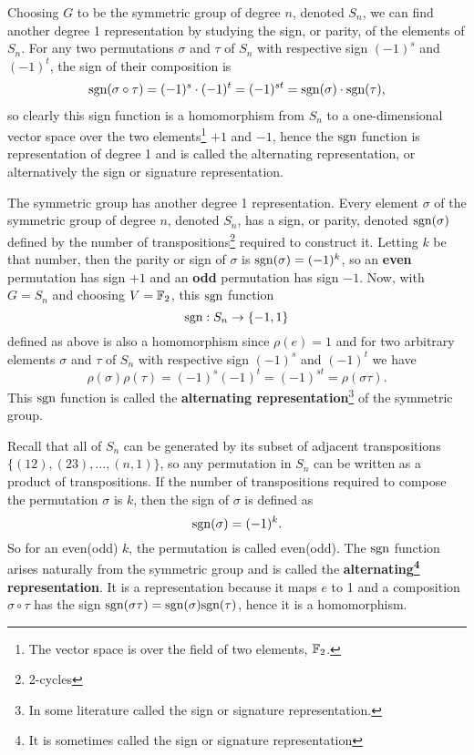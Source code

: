 	Choosing $G$ to be the symmetric group of degree $n$, denoted $S_n$, we can find another degree 1 representation by studying the sign, or parity, of the elements of $S_n$. For any two permutations $\sigma$ and $\tau$ of $S_n$ with respective sign $(-1)^s$ and $(-1)^t$, the sign of their composition is 
	\begin{align}
		\text{sgn}(\sigma \circ \tau) = (-1)^s \cdot (-1)^t = (-1)^{st} = \text{sgn}(\sigma) \cdot \text{sgn}(\tau),
	\end{align}
	so clearly this sign function is a homomorphism from $S_n$ to a one-dimensional vector space over the two elements\footnote{The vector space is over the field of two elements, $\mathbb{F}_2$.} $+1$ and $-1$, hence the $\text{sgn}$ function is representation of degree 1 and is called the alternating representation, or alternatively the sign or signature representation.
	
	The symmetric group has another degree 1 representation. Every element $\sigma$ of the symmetric group of degree $n$, denoted $S_n$, has a sign, or parity, denoted $\text{sgn}(\sigma)$ defined by the number of transpositions\footnote{2-cycles} required to construct it. Letting $k$ be that number, then the parity or sign of $\sigma$ is $\text{sgn}(\sigma)=(-1)^k$, so an \textbf{even} permutation has sign $+1$ and an \textbf{odd} permutation has sign $-1$. Now, with $G = S_n$ and choosing $V=\mathbb{F}_2$, this $\text{sgn}$ function
	\[
	\text{sgn}: S_n \rightarrow \{-1, 1\}
	\]
	defined as above is also a homomorphism since $\rho(e) = 1$ and for two arbitrary elements $\sigma$ and $\tau$ of $S_n$ with respective sign $(-1)^s$ and $(-1)^t$ we have 
	\[
	\rho(\sigma)\rho(\tau) = (-1)^s(-1)^t = (-1)^{st} = \rho(\sigma\tau).
	\] 
	This $\text{sgn}$ function is called the \textbf{alternating representation}\footnote{In some literature called the sign or signature representation.} of the symmetric group.
	
	Recall that all of $S_n$ can be generated by its subset of adjacent transpositions $\{(12), (23), \dots, (n,1)\}$, so any permutation in $S_n$ can be written as a product of transpositions. If the number of transpositions required to compose the permutation $\sigma$ is $k$, then the sign of $\sigma$ is defined as
	\[
	\text{sgn}(\sigma) = (-1)^k.
	\]
	So for an even(odd) $k$, the permutation is called even(odd). The $\text{sgn}$ function arises naturally from the symmetric group and is called the \textbf{alternating\footnote{It is sometimes called the sign or signature representation} representation}. It is a representation because it maps $e$ to 1 and a composition $\sigma \circ \tau$ has the sign $\text{sgn}(\sigma\tau) =\text{sgn}(\sigma)\text{sgn}(\tau)$, hence it is a homomorphism.
	
